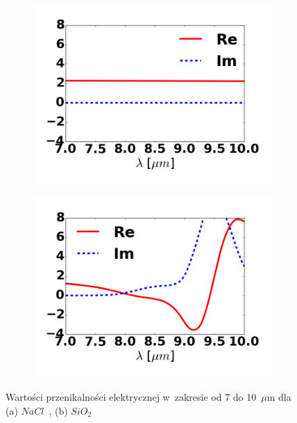 \begin{figure}[tb]
	\begin{subfigure}{0.45\textwidth}
		\includegraphics[width=\textwidth]{images/pml/nacl.png}
		\caption{}
	\end{subfigure}
	\begin{subfigure}{0.45\textwidth}
		\includegraphics[width=\textwidth]{images/pml/sio2.png}	
		\caption{}
	\end{subfigure}
	\caption{Wartości przenikalności elektrycznej w~zakresie od 7 do 10~$\mu$m dla (a) $NaCl$~\cite{li1976refractive}, (b) $SiO_2$~\cite{Kischkat:12}}
	\label{fig:nacl-sio2-mat}
\end{figure}

